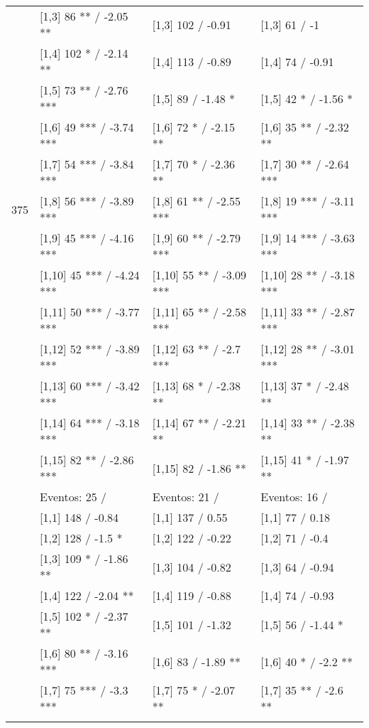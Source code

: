 \begin{table}
\begin{tabular}[t]{llll}
 & {}[1,3] 86 ** / -2.05 ** & {}[1,3] 102  / -0.91 & {}[1,3] 61  / -1\\
\addlinespace
 & {}[1,4] 102 * / -2.14 ** & {}[1,4] 113  / -0.89 & {}[1,4] 74  / -0.91\\
 & {}[1,5] 73 ** / -2.76 *** & {}[1,5] 89  / -1.48 * & {}[1,5] 42 * / -1.56 *\\
 & {}[1,6] 49 *** / -3.74 *** & {}[1,6] 72 * / -2.15 ** & {}[1,6] 35 ** / -2.32 **\\
 & {}[1,7] 54 *** / -3.84 *** & {}[1,7] 70 * / -2.36 ** & {}[1,7] 30 ** / -2.64 ***\\
375 & {}[1,8] 56 *** / -3.89 *** & {}[1,8] 61 ** / -2.55 *** & {}[1,8] 19 *** / -3.11 ***\\
\addlinespace
 & {}[1,9] 45 *** / -4.16 *** & {}[1,9] 60 ** / -2.79 *** & {}[1,9] 14 *** / -3.63 ***\\
 & {}[1,10] 45 *** / -4.24 *** & {}[1,10] 55 ** / -3.09 *** & {}[1,10] 28 ** / -3.18 ***\\
 & {}[1,11] 50 *** / -3.77 *** & {}[1,11] 65 ** / -2.58 *** & {}[1,11] 33 ** / -2.87 ***\\
 & {}[1,12] 52 *** / -3.89 *** & {}[1,12] 63 ** / -2.7 *** & {}[1,12] 28 ** / -3.01 ***\\
 & {}[1,13] 60 *** / -3.42 *** & {}[1,13] 68 * / -2.38 ** & {}[1,13] 37 * / -2.48 **\\
\addlinespace
 & {}[1,14] 64 *** / -3.18 *** & {}[1,14] 67 ** / -2.21 ** & {}[1,14] 33 ** / -2.38 **\\
 & {}[1,15] 82 ** / -2.86 *** & {}[1,15] 82  / -1.86 ** & {}[1,15] 41 * / -1.97 **\\
 & Eventos:  25 / & Eventos:  21 / & Eventos:  16 /\\
 & {}[1,1] 148  / -0.84 & {}[1,1] 137  / 0.55 & {}[1,1] 77  / 0.18\\
 & {}[1,2] 128  / -1.5 * & {}[1,2] 122  / -0.22 & {}[1,2] 71  / -0.4\\
\addlinespace
 & {}[1,3] 109 * / -1.86 ** & {}[1,3] 104  / -0.82 & {}[1,3] 64  / -0.94\\
 & {}[1,4] 122  / -2.04 ** & {}[1,4] 119  / -0.88 & {}[1,4] 74  / -0.93\\
 & {}[1,5] 102 * / -2.37 ** & {}[1,5] 101  / -1.32 & {}[1,5] 56  / -1.44 *\\
 & {}[1,6] 80 ** / -3.16 *** & {}[1,6] 83  / -1.89 ** & {}[1,6] 40 * / -2.2 **\\
 & {}[1,7] 75 *** / -3.3 *** & {}[1,7] 75 * / -2.07 ** & {}[1,7] 35 ** / -2.6 **\\
\addlinespace

\end{tabular}
\end{table}
